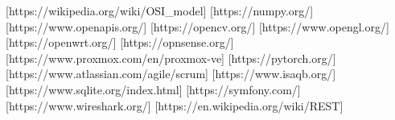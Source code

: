 \documentclass{cvhub}
\begin{document}
{{\begin{sortedBubbles}
        [https://wikipedia.org/wiki/OSI_model]
        [https://numpy.org/]
        [https://www.openapis.org/]
        [https://opencv.org/]
        [https://www.opengl.org/]
        [https://openwrt.org/]
        [https://opnsense.org/]
        [https://www.proxmox.com/en/proxmox-ve]
        [https://pytorch.org/]
        [https://www.atlassian.com/agile/scrum]
        [https://www.isaqb.org/]
        [https://www.sqlite.org/index.html]
        [https://symfony.com/]
        [https://www.wireshark.org/]    
        [https://en.wikipedia.org/wiki/REST]
    \end{sortedBubbles}
}
}
\end{document}
